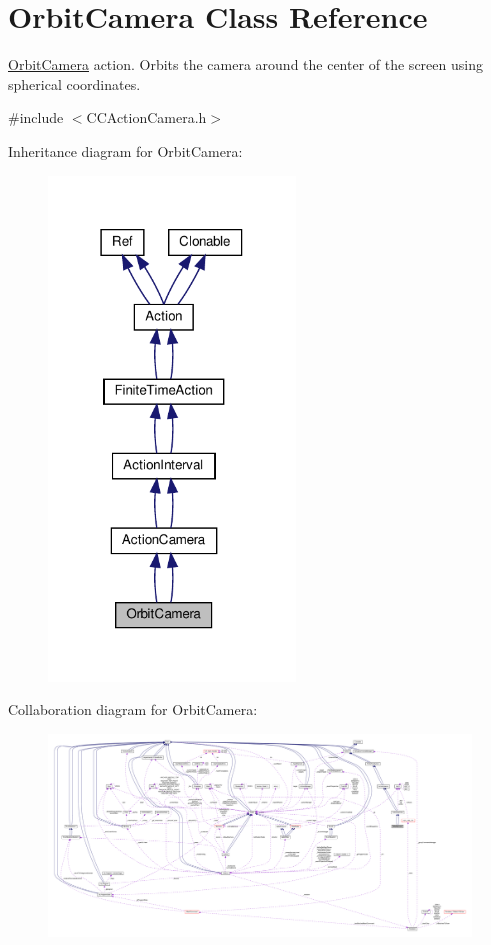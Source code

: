 \hypertarget{classOrbitCamera}{}\section{Orbit\+Camera Class Reference}
\label{classOrbitCamera}


\hyperlink{classOrbitCamera}{Orbit\+Camera} action. Orbits the camera around the center of the screen using spherical coordinates.  




{\ttfamily \#include $<$C\+C\+Action\+Camera.\+h$>$}



Inheritance diagram for Orbit\+Camera\+:
\nopagebreak
\begin{figure}[H]
\begin{center}
\leavevmode
\includegraphics[width=186pt]{classOrbitCamera__inherit__graph}
\end{center}
\end{figure}


Collaboration diagram for Orbit\+Camera\+:
\nopagebreak
\begin{figure}[H]
\begin{center}
\leavevmode
\includegraphics[width=350pt]{classOrbitCamera__coll__graph}
\end{center}
\end{figure}
